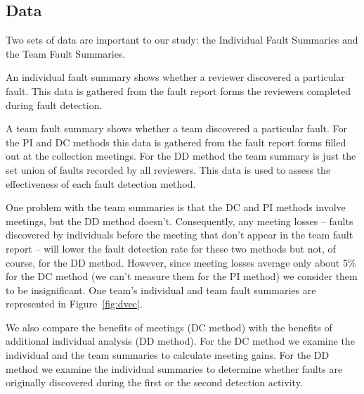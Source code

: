 \subsection{Data}

Two sets of data are important to our study:  
the Individual Fault Summaries and the Team 
Fault Summaries. 


An individual fault summary shows whether a reviewer discovered
a particular fault. This data is gathered from the fault report forms
the reviewers completed during fault detection.

A team fault summary shows whether a team discovered a particular 
fault. For the PI and DC methods this data is gathered from the fault report 
forms filled out at the collection meetings. For the DD method the team 
summary is just the set union of faults recorded by all reviewers. This data
is used to assess the effectiveness of each fault detection method. 


One problem with the team summaries is that the DC and PI methods 
involve meetings, but the DD method doesn't. Consequently, 
any meeting losses -- faults discovered by individuals before 
the meeting that don't appear in the team fault report --
will lower the fault detection rate for these two methods
but not, of course, for the DD method.  However, 
since meeting losses average only
about 5\% for the DC method (we can't measure them for the PI method) 
we consider them to be insignificant.
One team's individual and team fault summaries are represented 
in Figure~\ref{fig:dvec}.

We also compare the benefits of meetings (DC method)
with the benefits of additional individual analysis (DD method).
For the DC method we examine the individual and the team summaries
to calculate meeting gains. For the DD method we examine the
individual summaries to determine whether faults are originally 
discovered during the first or the second detection activity.


%

